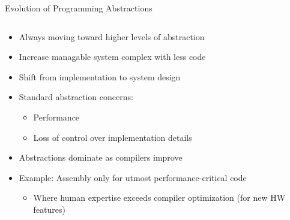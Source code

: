 \documentclass[xcolor=dvipsnames, aspectratio=169]{beamer}
\begin{document}
\begin{frame}{Evolution of Programming Abstractions}
  \begin{columns}
    \begin{column}{0.6\textwidth}
      \begin{itemize}
        \item Always moving toward higher levels of abstraction
        \item Increase managable system complex with less code
        \item Shift from implementation to system design
        \item Standard abstraction concerns:
          \begin{itemize}
            \item Performance
            \item Loss of control over implementation details
          \end{itemize}
        \item Abstractions dominate as compilers improve
        \item Example: Assembly only for utmost performance-critical code
          \begin{itemize}
            \item Where human expertise exceeds compiler optimization (for new HW features)
          \end{itemize}
      \end{itemize}
    \end{column}
    
    \begin{column}{0.4\textwidth}
      \centering
\end{column}
\end{columns}
\end{frame}
\end{document}
